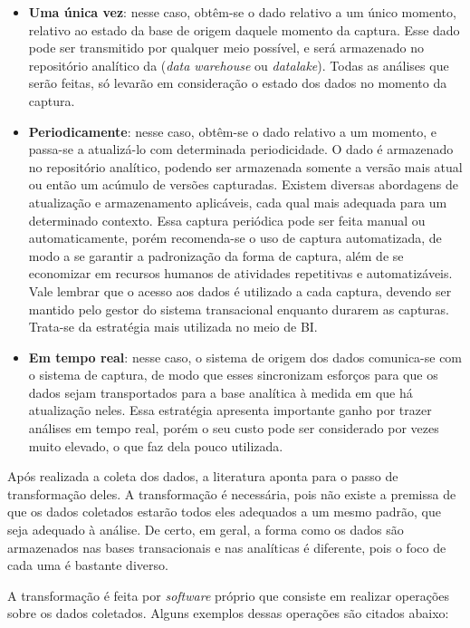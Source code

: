 \begin{itemize}
    \item \textbf{Uma única vez}: nesse caso, obtêm-se o dado relativo a um único momento, relativo ao estado da base de origem daquele momento da captura. Esse dado pode ser transmitido por qualquer meio possível, e será armazenado no repositório analítico da (\emph{data warehouse} ou \emph{datalake}). Todas as análises que serão feitas, só levarão em consideração o estado dos dados no momento da captura.
    \item \textbf{Periodicamente}: nesse caso, obtêm-se o dado relativo a um momento, e passa-se a atualizá-lo com determinada periodicidade. O dado é armazenado no repositório analítico, podendo ser armazenada somente a versão mais atual ou então um acúmulo de versões capturadas. Existem diversas abordagens de atualização e armazenamento aplicáveis, cada qual mais adequada para um determinado contexto. Essa captura periódica pode ser feita manual ou automaticamente, porém recomenda-se o uso de captura automatizada, de modo a se garantir a padronização da forma de captura, além de se economizar em recursos humanos de atividades repetitivas e automatizáveis. Vale lembrar que o acesso aos dados é utilizado a cada captura, devendo ser mantido pelo gestor do sistema transacional enquanto durarem as capturas. Trata-se da estratégia mais utilizada no meio de BI.
    \item \textbf{Em tempo real}: nesse caso, o sistema de origem dos dados comunica-se com o sistema de captura, de modo que esses sincronizam esforços para que os dados sejam transportados para a base analítica à medida em que há atualização neles. Essa estratégia apresenta importante ganho por trazer análises em tempo real, porém o seu custo pode ser considerado por vezes muito elevado, o que faz dela pouco utilizada.
\end{itemize}

Após realizada a coleta dos dados, a literatura aponta para o passo de transformação deles. A transformação é necessária, pois não existe a premissa de que os dados coletados estarão todos eles adequados a um mesmo padrão, que seja adequado à análise. De certo, em geral, a forma como os dados são armazenados nas bases transacionais e nas analíticas é diferente, pois o foco de cada uma é bastante diverso.

A transformação é feita por \emph{software} próprio que consiste em realizar operações sobre os dados coletados. Alguns exemplos dessas operações são citados abaixo:

